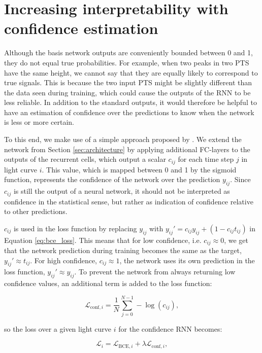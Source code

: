 
\section{Increasing interpretability with confidence estimation}
\label{sec:rnn_conf}

Although the basis network outputs are conveniently bounded between 0 and 1, they do not equal true probabilities. For example, when two peaks in two PTS have the same height, we cannot say that they are equally likely to correspond to true signals. This is because the two input PTS might be slightly different than the data seen during training, which could cause the outputs of the RNN to be less reliable. In addition to the standard outputs, it would therefore be helpful to have an estimation of confidence over the predictions to know when the network is less or more certain.

To this end, we make use of a simple approach proposed by \cite{devries2018learning}. We extend the network from Section \ref{sec:architecture} by applying additional FC-layers to the outputs of the recurrent cells, which output a scalar $c_{ij}$ for each time step $j$ in light curve $i$. This value, which is mapped between 0 and 1 by the sigmoid function, represents the confidence of the network over the prediction $y_{ij}$. Since $c_{ij}$ is still the output of a neural network, it should not be interpreted as confidence in the statistical sense, but rather as indication of confidence relative to other predictions. 

$c_{ij}$ is used in the loss function by replacing $y_{ij}$ with $y_{ij}' = c_{ij} y_{ij} +  (1-c_{ij} t_{ij})$ in Equation \ref{eq:bce_loss}. This means that for low confidence, i.e. $c_{ij} \approx 0$, we get that the network prediction during training becomes the same as the target, $y_{ij}' \approx t_{ij}$. For high confidence, $c_{ij} \approx 1$, the network uses its own prediction in the loss function, $y_{ij}' \approx y_{ij}$. To prevent the network from always returning low confidence values, an additional term is added to the loss function: 

\begin{equation}
    \mathcal{L}_{\text{conf},i} = 
    \frac{1}{N}\sum^{N-1}_{j=0} -\log(c_{ij}),
\end{equation}

\noindent so the loss over a given light curve $i$ for the confidence RNN becomes:

\begin{equation}
    \mathcal{L}_i = \mathcal{L}_{\text{BCE},i} + \lambda \mathcal{L}_{\text{conf},i},
\end{equation}

